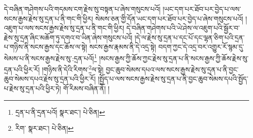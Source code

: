 དེ་བཞིན་གཤེགས་པའི་གདམས་ངག་རྗེས་སུ་བསྟན་པ་ཞེས་གསུངས་པའོ། །ཡང་དག་པར་ཐོབ་པར་བྱེད་པ་ལས་སངས་རྒྱས་རྗེས་སུ་དྲན་པ་ནི་གང་གི་ཕྱིར། སེམས་ཅན་གྱི་དོན་ཡང་དག་པར་ཐོབ་པར་བྱེད་པ་ཞེས་གསུངས་པའོ། །འཇུག་པ་ལས་སངས་རྒྱས་རྗེས་སུ་དྲན་པ་ནི་གང་གི་ཕྱིར། དེ་བཞིན་གཤེགས་པའི་ཡེ་ཤེས་ལ་འཇུག་པའི་སྦྱོར་བ་རྗེས་སུ་དྲན་ཞིང་མཆོག་ཏུ་དགའ་བ་ཡིན་ཞེས་གསུངས་པའོ། །དེ་ལ་རྗེས་སུ་དྲན་པ་དང་པོ་དང་ལྷན་ཅིག་པའི་དྲན་པ་གཉིས་ནི་སངས་རྒྱས་དང་ཆོས་ལ་སྟེ། སངས་རྒྱས་རྣམས་ནི་དེ་འདྲ་སྟེ། བདག་ཀྱང་དེ་འདྲ་བར་འགྱུར་རོ་སྙམ་དུ་སེམས་པ་ནི་སངས་རྒྱས་རྗེས་སུ་:དྲན་པའོ།\footnote{དྲན་པ་ནི་དྲན་པའོ།  སྣར་ཐང་།  པེ་ཅིན། } །སངས་རྒྱས་ཀྱི་ཆོས་ཀྱང་རྗེས་སུ་དྲན་པ་ནི་སངས་རྒྱས་ཀྱི་ཆོས་རྗེས་སུ་དྲན་པའི་ཕྱིར་རོ། །གཉིས་ནི་དེའི་རིགས་\footnote{རིག་  སྣར་ཐང་།  པེ་ཅིན། }ལ་སྟེ། བྱང་ཆུབ་སེམས་དཔའ་ལས་སངས་རྒྱས་རྗེས་སུ་དྲན་པ་ནི་བྱང་ཆུབ་སེམས་དཔའ་རྗེས་སུ་དྲན་པའི་ཕྱིར་རོ། །སྤྱོད་པ་ལས་སངས་རྒྱས་རྗེས་སུ་དྲན་པ་ནི་བྱང་ཆུབ་སེམས་དཔའི་སྤྱོད་པ་རྗེས་སུ་དྲན་པའི་ཕྱིར་ཏེ། གོ་རིམས་བཞིན་ནོ། །
